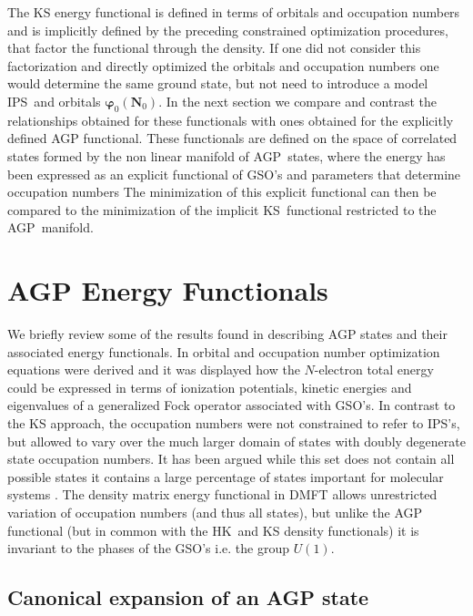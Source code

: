 \documentclass[aps,preprint]{revtex4}%
\begin{document}
The KS energy functional is defined in terms of orbitals and occupation
numbers and is implicitly defined by the preceding constrained optimization
procedures, that factor the functional through the density. If one did not
consider this factorization and directly optimized the orbitals and occupation
numbers one would determine the same ground state, but not need to introduce a
model IPS\ and orbitals $\boldsymbol{\varphi}_{0}\left(  \boldsymbol{N}%
_{0}\right)  $. In the next section we compare and contrast the relationships
obtained for these functionals with ones obtained for the explicitly defined
AGP functional. These functionals are defined on the space of correlated
states formed by the non linear manifold of AGP\ states, where the energy has
been expressed as an explicit functional of GSO's and parameters that
determine occupation numbers \cite{OrtizWeiner2006} The minimization of this
explicit functional can then be compared to the minimization of the implicit
KS\ functional restricted to the AGP\ manifold.

\section{AGP Energy Functionals \label{AGP}}

We briefly review some of the results found in \cite{OrtizWeiner2006}
describing AGP states and their associated energy functionals. In
\cite{OrtizWeiner2006} orbital and occupation number optimization equations
were derived and it was displayed how the $N$-electron total energy could be
expressed in terms of ionization potentials, kinetic energies and eigenvalues
of a generalized Fock operator associated with GSO's. In contrast to the KS
approach, the occupation numbers were not constrained to refer to IPS's, but
allowed to vary over the much larger domain of states with doubly degenerate
state occupation numbers. It has been argued while this set does not contain
all possible states it contains a large percentage of states important for
molecular systems \cite{Kramers Deg}. The density matrix energy functional in
DMFT allows unrestricted variation of occupation numbers (and thus all
states), but unlike the AGP functional (but in common with the HK\ and KS
density functionals) it is invariant to the phases of the GSO's i.e. the group
$U\left(  1\right)  .$

\subsection{Canonical expansion of an AGP state}
\end{document}
